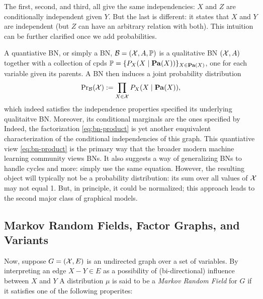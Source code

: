 The first, second, and third, all give the same independencies: $X$ and $Z$ are conditionally independent given $Y$.  But the last is different: it states that $X$ and $Y$ are independent (but $Z$ can have an arbitrary relation with both).
This intuition can be further clarified once we add probabilities.

A quantiative BN, or simply a BN, 
    $\mathcal B = (\mathcal X, A, \mathbb P)$ 
    is a qualitative BN $(\mathcal X, A)$ together with a collection 
    of cpds $\mathbb P = \{ P_X( X \mid \mathop{\mathbf{Pa}}(X)) \}_{X \in \mathop{\mathbf{Pa}}(X)}$,
    one for each variable given its parents. 
A BN then induces a joint probability distribution 
\begin{equation}
    \Pr\nolimits_{\cal B}(\mathcal X) := \prod_{X \in \mathcal X} P_X( X \mid \mathop{\mathbf{Pa}}(X) ),
        \label{eq:bn-product}
\end{equation}
which indeed satisfies the independence properties specified its underlying qualitaitve BN. Moreover, its conditional marginals are the ones specified by 
Indeed, the factorization \eqref{eq:bn-product} is yet another euquivalent characterization of the conditional independencies of this graph.  
This quantiative view \eqref{eq:bn-product} is the primary way that the broader modern machine learning community views BNs.
It also suggests a way of generalizing BNs to handle cycles and more: simply use the same equation.
However, the resulting object will typically not be a probability distribution: its sum over all values of $\mathcal X$ may not equal 1. 
But, in principle, it could be normalized;
    this approach leads to the second major class of graphical models.  



\subsection{Markov Random Fields, Factor Graphs, and Variants}

Now, suppose $G = (\mathcal X, E)$ is an undirected graph over a set of variables.
By interpreting an edge $X{-}Y \in E$ as a possibility of (bi-directional) influence between $X$ and $Y$
A distribution $\mu$ is said to be a \emph{Markov Random Field} for $G$ if it satisfies one of the following properites:

